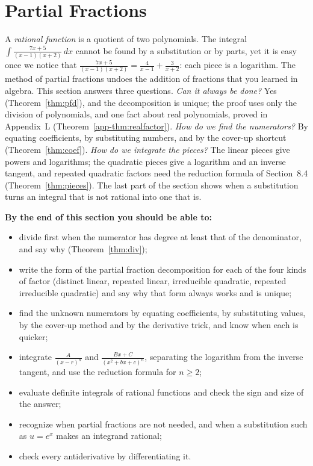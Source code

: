 \documentclass[11pt]{article}
\begin{document}
\section{Partial Fractions}

\begin{guide}
A \emph{rational function} is a quotient of two polynomials. The integral $\int\frac{7x+5}{(x-1)(x+2)}\,dx$ cannot be found by a substitution or by parts, yet it is easy once we notice that $\frac{7x+5}{(x-1)(x+2)}=\frac4{x-1}+\frac3{x+2}$: each piece is a logarithm. The method of partial fractions undoes the addition of fractions that you learned in algebra. This section answers three questions. \emph{Can it always be done?} Yes (Theorem~\ref{thm:pfd}), and the decomposition is unique; the proof uses only the division of polynomials, and one fact about real polynomials, proved in Appendix~L (Theorem~\ref{app-thm:realfactor}). \emph{How do we find the numerators?} By equating coefficients, by substituting numbers, and by the cover-up shortcut (Theorem~\ref{thm:coef}). \emph{How do we integrate the pieces?} The linear pieces give powers and logarithms; the quadratic pieces give a logarithm and an inverse tangent, and repeated quadratic factors need the reduction formula of Section~8.4 (Theorem~\ref{thm:pieces}). The last part of the section shows when a substitution turns an integral that is not rational into one that is.
\end{guide}

\textbf{By the end of this section you should be able to:}
\begin{itemize}
  \item divide first when the numerator has degree at least that of the denominator, and say why (Theorem~\ref{thm:div});
  \item write the form of the partial fraction decomposition for each of the four kinds of factor (distinct linear, repeated linear, irreducible quadratic, repeated irreducible quadratic) and say why that form always works and is unique;
  \item find the unknown numerators by equating coefficients, by substituting values, by the cover-up method and by the derivative trick, and know when each is quicker;
  \item integrate $\frac A{(x-r)^n}$ and $\frac{Bx+C}{(x^2+bx+c)^n}$, separating the logarithm from the inverse tangent, and use the reduction formula for $n\ge2$;
  \item evaluate definite integrals of rational functions and check the sign and size of the answer;
  \item recognize when partial fractions are not needed, and when a substitution such as $u=e^x$ makes an integrand rational;
  \item check every antiderivative by differentiating it.
\end{itemize}
\end{document}

